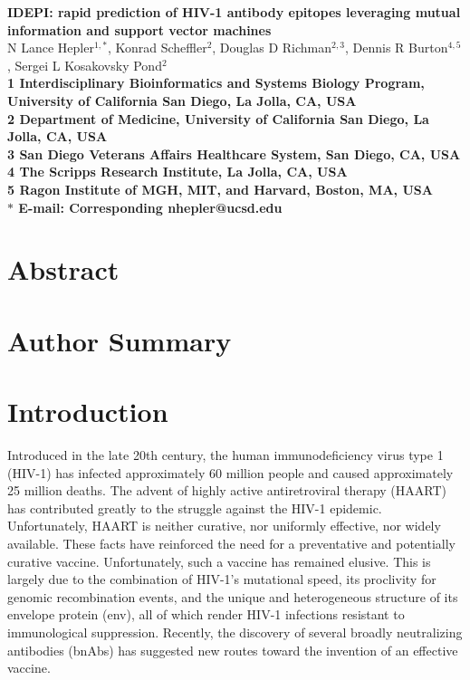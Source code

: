 \documentclass[10pt]{article}
\date{}
\newcommand{\idepi}{{IDEPI}}
\newcommand{\hiv}{{HIV}-1}
\begin{document}
\begin{flushleft}
{\Large
\textbf{\idepi{}: rapid prediction of \hiv{} antibody epitopes leveraging mutual information and support vector machines}
}
\\
N Lance Hepler$^{1,\ast}$,
Konrad Scheffler$^{2}$,
Douglas D Richman$^{2,3}$,
Dennis R Burton$^{4,5}$,
Sergei L Kosakovsky Pond$^{2}$
\\
\bf{1} Interdisciplinary Bioinformatics and Systems Biology Program, University of California San Diego, La Jolla, CA, USA
\\
\bf{2} Department of Medicine, University of California San Diego, La Jolla, CA, USA
\\
\bf{3} San Diego Veterans Affairs Healthcare System, San Diego, CA, USA
\\
\bf{4} The Scripps Research Institute, La Jolla, CA, USA
\\
\bf{5} Ragon Institute of {MGH}, {MIT}, and Harvard, Boston, MA, USA
\\
$\ast$ E-mail: Corresponding nhepler@ucsd.edu
\end{flushleft}

\section*{Abstract}

\section*{Author Summary}

\section*{Introduction}
Introduced in the late 20th century,
the human immunodeficiency virus type 1 (\hiv{}) has infected approximately 60 million people
and caused approximately 25 million deaths.
The advent of highly active antiretroviral therapy ({HAART}) has contributed greatly to the struggle against the \hiv{} epidemic.
Unfortunately, HAART is neither curative, nor uniformly effective, nor widely available.
These facts have reinforced the need for a preventative and potentially curative vaccine.
Unfortunately, such a vaccine has remained elusive.
This is largely due to the combination of \hiv{}'s mutational speed,
its proclivity for genomic recombination events,
and the unique and heterogeneous structure of its envelope protein (env),
all of which render \hiv{} infections resistant to immunological suppression.
Recently, the discovery of several broadly neutralizing antibodies (bnAbs) has suggested new routes toward the invention of an effective vaccine.
\end{document}
